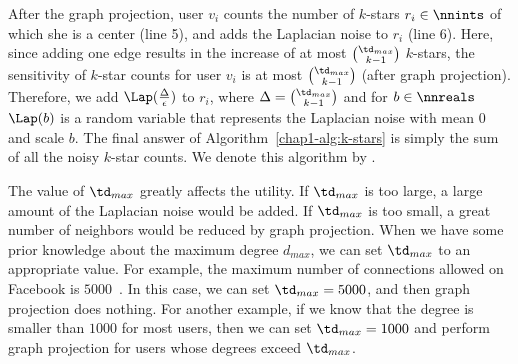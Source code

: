 After the graph projection, 
user $v_i$ 
counts the number of $k$-stars $r_i \in \nnints$ of which she is a center (line 5), and 
adds the Laplacian noise 
to 
$r_i$ 
(line 6). 
Here, since adding one edge results in the increase of at most $\binom{\td_{max}}{k-1}$ $k$-stars, the 
sensitivity of 
$k$-star counts for user $v_i$ 
is at most $\binom{\td_{max}}{k-1}$ (after graph projection). 
Therefore, we add $\Lap(\frac{\Delta}{\epsilon})$ to $r_i$, where $\Delta = \binom{\td_{max}}{k-1}$ and 
for $b \in \nnreals$ 
$\Lap(b)$ is a random variable that represents the Laplacian noise with mean $0$ and scale $b$. 
The final answer of Algorithm~\ref{chap1-alg:k-stars} is
simply the sum of all the noisy $k$-star counts. 
We denote this algorithm by .

The value of $\td_{max}$ greatly affects the utility. 
If $\td_{max}$ is too large, a large amount of the Laplacian noise would be added. 
If $\td_{max}$ is too small, a great number of neighbors would be reduced by 
graph projection. 
When we have some prior knowledge about the maximum degree $d_{max}$, we can set $\td_{max}$ to an appropriate value. 
For example, 
the maximum number of connections allowed on Facebook is $5000$~\cite{Facebook_Limit}. 
In this case, we can set $\td_{max}=5000$, and then graph projection does nothing. 
For another example, 
if we know that the degree is smaller than $1000$ for most users, then we can set $\td_{max} = 1000$ and perform graph projection for 
users whose degrees exceed $\td_{max}$. 

